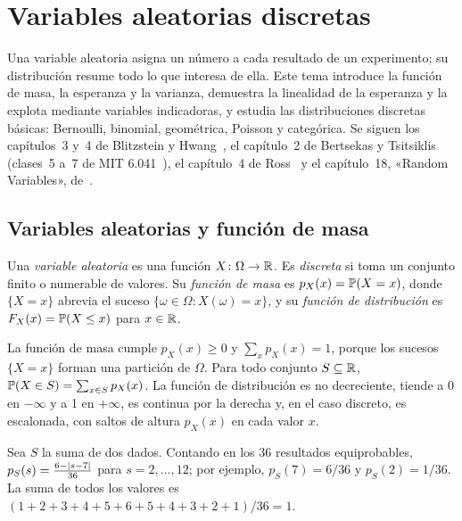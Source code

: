 \chapter{Variables aleatorias discretas}
\label{tema:5}

Una variable aleatoria asigna un número a cada resultado de un experimento; su distribución resume todo lo que interesa de ella. Este tema introduce la función de masa, la esperanza y la varianza, demuestra la linealidad de la esperanza y la explota mediante variables indicadoras, y estudia las distribuciones discretas básicas: Bernoulli, binomial, geométrica, Poisson y categórica. Se siguen los capítulos~3 y~4 de Blitzstein y Hwang~\cite{bh}, el capítulo~2 de Bertsekas y Tsitsiklis~\cite{bt} (clases~5 a~7 de MIT 6.041~\cite{mit6041f10}), el capítulo~4 de Ross~\cite{ross} y el capítulo~18, «Random Variables», de~\cite{mcs}.

\section{Variables aleatorias y función de masa}

\begin{definicion}
Una \emph{variable aleatoria} es una función $X\colon\Omega\to\mathbb{R}$. Es \emph{discreta} si toma un conjunto finito o numerable de valores. Su \emph{función de masa} es $p_X(x)=\mathbb{P}(X=x)$, donde $\{X=x\}$ abrevia el suceso $\{\omega\in\Omega: X(\omega)=x\}$, y su \emph{función de distribución} es $F_X(x)=\mathbb{P}(X\le x)$ para $x\in\mathbb{R}$.
\end{definicion}

La función de masa cumple $p_X(x)\ge0$ y $\sum_xp_X(x)=1$, porque los sucesos $\{X=x\}$ forman una partición de $\Omega$. Para todo conjunto $S\subseteq\mathbb{R}$, $\mathbb{P}(X\in S)=\sum_{x\in S}p_X(x)$. La función de distribución es no decreciente, tiende a 0 en $-\infty$ y a 1 en $+\infty$, es continua por la derecha y, en el caso discreto, es escalonada, con saltos de altura $p_X(x)$ en cada valor $x$.

\begin{ejemplo}\label{ej:t5-suma}
Sea $S$ la suma de dos dados. Contando en los 36 resultados equiprobables, $p_S(s)=\frac{6-\lvert s-7\rvert}{36}$ para $s=2,\dots,12$; por ejemplo, $p_S(7)=6/36$ y $p_S(2)=1/36$. La suma de todos los valores es $(1+2+3+4+5+6+5+4+3+2+1)/36=1$.
\end{ejemplo}

